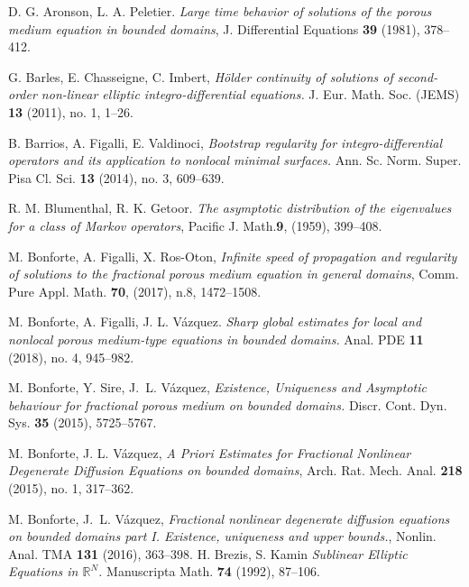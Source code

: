 \documentclass[11pt]{article}
\numberwithin{equation}{section}
\newcommand{\RR}{\mathbb{R}}
\begin{document}
\begin{thebibliography}{00}%
\small

 D. G. Aronson, L. A. Peletier. \textit{Large time behavior of solutions of the porous medium equation in bounded domains}, J. Differential Equations \textbf{39} (1981), 378--412.

G. Barles, E. Chasseigne, C. Imbert, \textit{H\"older continuity of solutions of second-order non-linear elliptic integro-differential equations. } J. Eur. Math. Soc. (JEMS) \textbf{13} (2011), no. 1, 1--26.

B. Barrios, A. Figalli, E. Valdinoci, \textit{Bootstrap regularity for integro-differential operators and its application to nonlocal minimal surfaces. }Ann. Sc. Norm. Super. Pisa Cl. Sci.  \textbf{13} (2014), no. 3, 609--639.

 R. M. Blumenthal, R. K. Getoor.
\textit{The asymptotic distribution of the eigenvalues for a class
of Markov operators}, Pacific J. Math.{\bf 9}, (1959), 399--408.

   M. Bonforte, A. Figalli, X. Ros-Oton, \textit{Infinite speed of propagation and regularity of solutions to the fractional porous medium equation in general domains}, Comm. Pure Appl. Math. \textbf{70}, (2017), n.8, 1472--1508. %


 M. Bonforte, A. Figalli, J. L. V{\'a}zquez. \textit{Sharp global estimates for local and nonlocal  porous medium-type equations in bounded domains. } Anal. PDE \textbf{11} (2018), no. 4, 945--982.

 M. Bonforte, Y. Sire, J.~L. V\'azquez, \textit{Existence, Uniqueness and Asymptotic behaviour for fractional porous medium on bounded domains.} Discr. Cont. Dyn. Sys. \textbf{35} (2015), 5725--5767.

 M. Bonforte,  J. L. V\'azquez, \textit{A Priori Estimates  for Fractional Nonlinear  Degenerate Diffusion Equations on bounded domains},  Arch. Rat. Mech. Anal. \textbf{218} (2015), no. 1, 317--362.

  {\rm M.  Bonforte, J.~L. V\'azquez}, \textit{Fractional nonlinear degenerate diffusion equations on bounded domains part I. Existence, uniqueness and upper bounds.},  Nonlin. Anal. TMA \textbf{131} (2016), 363--398.  %
%
 H. Brezis, S. Kamin \textit{Sublinear Elliptic Equations in $\RR^N$. } Manuscripta Math. \textbf{74} (1992), 87--106.


\end{thebibliography}
\end{document}
